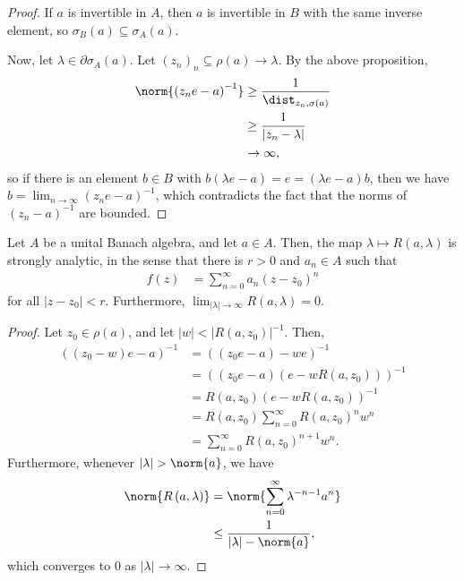 \documentclass[10pt]{mypackage}
\begin{document}
\begin{proof}
  If $a$ is invertible in $A$, then $a$ is invertible in $B$ with the same inverse element, so $\sigma_B(a)\subseteq \sigma_A(a)$.

  Now, let $\lambda\in \partial \sigma_A(a)$. Let $\left( z_n \right)_n\subseteq \rho(a)\rightarrow \lambda$. By the above proposition,
  \begin{align*}
    \norm{\left( z_n e-a \right)^{-1}} &\geq \frac{1}{\dist_{z_n,\sigma(a)}}\\
                                       &\geq \frac{1}{\left\vert z_n-\lambda \right\vert}\\
                                       &\rightarrow\infty,
  \end{align*}
  so if there is an element $b\in B$ with $b\left( \lambda e-a \right) = e = \left( \lambda e-a \right)b$, then we have $b = \lim_{n\rightarrow\infty}\left( z_n e - a \right)^{-1}$, which contradicts the fact that the norms of $\left( z_n-a \right)^{-1}$ are bounded.
\end{proof}
\begin{theorem}
  Let $A$ be a unital Banach algebra, and let $a\in A$. Then, the map $\lambda\mapsto R\left( a,\lambda \right)$ is strongly analytic, in the sense that there is $r > 0$ and $a_n\in A$ such that
  \begin{align*}
    f(z) &= \sum_{n=0}^{\infty}a_n\left( z-z_0 \right)^{n}
  \end{align*}
  for all $\left\vert z-z_0 \right\vert < r$. Furthermore, $\lim_{\left\vert \lambda \right\vert\rightarrow\infty}R\left( a,\lambda \right) = 0$.
\end{theorem}
\begin{proof}
  Let $z_0\in \rho(a)$, and let $\left\vert w \right\vert < \left\vert R\left( a,z_0 \right) \right\vert^{-1}$. Then,
  \begin{align*}
    \left( \left( z_0 - w \right)e - a \right)^{-1} &= \left( \left( z_0e-a \right) - we \right)^{-1}\\
                                                    &= \left( \left( z_0e - a \right)\left( e - wR\left( a,z_0 \right) \right) \right)^{-1}\\
                                                    &= R\left( a,z_0 \right)\left( e-wR\left( a,z_0 \right) \right)^{-1}\\
                                                    &= R\left( a,z_0 \right)\sum_{n=0}^{\infty}R\left( a,z_0 \right)^{n}w^{n}\\
                                                    &= \sum_{n=0}^{\infty}R\left( a,z_0 \right)^{n+1}w^{n}.
  \end{align*}
  Furthermore, whenever $\left\vert \lambda \right\vert > \norm{a}$, we have
  \begin{align*}
    \norm{R\left( a,\lambda \right)} &= \norm{\sum_{n=0}^{\infty}\lambda^{-n-1}a^{n}}\\
                                     &\leq \frac{1}{\left\vert \lambda \right\vert-\norm{a}},
  \end{align*}
  which converges to $0$ as $\left\vert \lambda \right\vert\rightarrow\infty$.
\end{proof}
\end{document}
